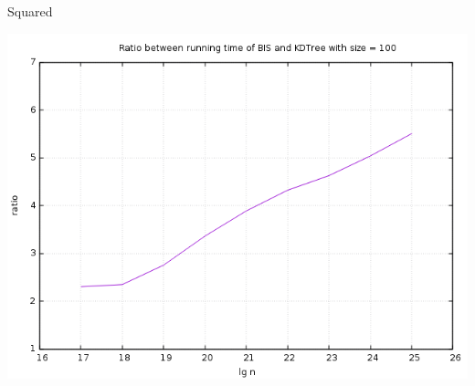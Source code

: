 \documentclass[pdf]{beamer}
\begin{document}
\begin{frame}{Squared}

  \begin{center}
    \includegraphics[scale=0.35]{pictures/analysis/factor_difference_sqrtn_100.png}
  \end{center}

\end{frame}
\end{document}
